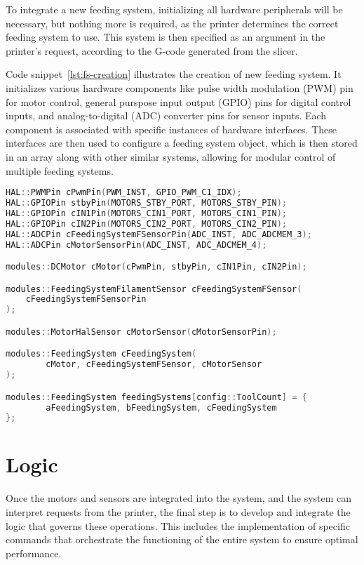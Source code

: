 To integrate a new feeding system, initializing all hardware peripherals will be necessary, but nothing more is required, as the printer determines the correct feeding system to use. This system is then specified as an argument in the printer's request, according to the G-code generated from the slicer.

Code snippet~\ref{lst:fs-creation} illustrates the creation of new feeding system. It initializes various hardware components like pulse width modulation (PWM) pin for motor control, general purspose input output (GPIO) pins for digital control inputs, and analog-to-digital (ADC) converter pins for sensor inputs. Each component is associated with specific instances of hardware interfaces. These interfaces are then used to configure a feeding system object, which is then stored in an array along with other similar systems, allowing for modular control of multiple feeding systems.

\begin{lstlisting}[language=c++, caption={MMU feeding system creation},label={lst:fs-creation},basicstyle=\ttfamily\small]
HAL::PWMPin cPwmPin(PWM_INST, GPIO_PWM_C1_IDX);
HAL::GPIOPin stbyPin(MOTORS_STBY_PORT, MOTORS_STBY_PIN);
HAL::GPIOPin cIN1Pin(MOTORS_CIN1_PORT, MOTORS_CIN1_PIN);
HAL::GPIOPin cIN2Pin(MOTORS_CIN2_PORT, MOTORS_CIN2_PIN);
HAL::ADCPin cFeedingSystemFSensorPin(ADC_INST, ADC_ADCMEM_3);
HAL::ADCPin cMotorSensorPin(ADC_INST, ADC_ADCMEM_4);

modules::DCMotor cMotor(cPwmPin, stbyPin, cIN1Pin, cIN2Pin);

modules::FeedingSystemFilamentSensor cFeedingSystemFSensor(
	cFeedingSystemFSensorPin
);

modules::MotorHalSensor cMotorSensor(cMotorSensorPin);

modules::FeedingSystem cFeedingSystem(
        cMotor, cFeedingSystemFSensor, cMotorSensor
);

modules::FeedingSystem feedingSystems[config::ToolCount] = {
        aFeedingSystem, bFeedingSystem, cFeedingSystem
};

\end{lstlisting}



\section{Logic}

Once the motors and sensors are integrated into the system, and the system can interpret requests from the printer, the final step is to develop and integrate the logic that governs these operations. This includes the implementation of specific commands that orchestrate the functioning of the entire system to ensure optimal performance.

